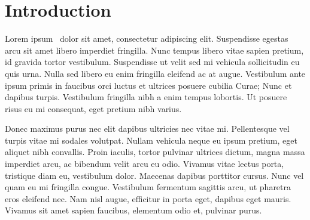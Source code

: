 \section{Introduction}
Lorem ipsum~\cite{spdk} dolor sit amet, consectetur adipiscing elit.
Suspendisse egestas arcu sit amet libero imperdiet fringilla. Nunc tempus
libero vitae sapien pretium, id gravida tortor vestibulum. Suspendisse ut velit
sed mi vehicula sollicitudin eu quis urna. Nulla sed libero eu enim fringilla
eleifend ac at augue. Vestibulum ante ipsum primis in faucibus orci luctus et
ultrices posuere cubilia Curae; Nunc et dapibus turpis. Vestibulum fringilla
nibh a enim tempus lobortis. Ut posuere risus eu mi consequat, eget pretium
nibh varius.

Donec maximus purus nec elit dapibus ultricies nec vitae mi. Pellentesque vel
turpis vitae mi sodales volutpat. Nullam vehicula neque eu ipsum pretium, eget
aliquet nibh convallis. Proin iaculis, tortor pulvinar ultrices dictum, magna
massa imperdiet arcu, ac bibendum velit arcu eu odio. Vivamus vitae lectus
porta, tristique diam eu, vestibulum dolor. Maecenas dapibus porttitor cursus.
Nunc vel quam eu mi fringilla congue. Vestibulum fermentum sagittis arcu, ut
pharetra eros eleifend nec. Nam nisl augue, efficitur in porta eget, dapibus
eget mauris. Vivamus sit amet sapien faucibus, elementum odio et, pulvinar
purus.
